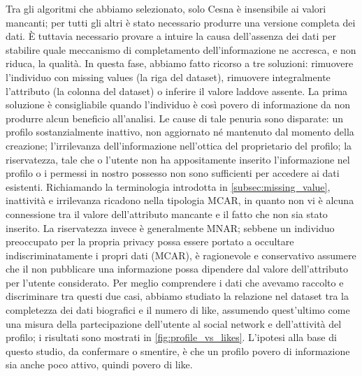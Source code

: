 Tra gli algoritmi che abbiamo selezionato, solo Cesna \cite{cesna} è insensibile ai valori mancanti; per tutti gli altri è stato necessario produrre una versione completa dei dati. \`E tuttavia necessario provare a intuire la causa dell'assenza dei dati per stabilire quale meccanismo di completamento dell'informazione ne accresca, e non riduca, la qualità. In questa fase, abbiamo fatto ricorso a tre soluzioni: rimuovere l'individuo con missing values (la riga del dataset), rimuovere integralmente l'attributo (la colonna del dataset) o inferire il valore laddove assente. La prima soluzione è consigliabile quando l'individuo è così povero di informazione da non produrre alcun beneficio all'analisi. Le cause di tale penuria sono disparate: un profilo sostanzialmente inattivo, non aggiornato né mantenuto dal momento della creazione; l'irrilevanza dell'informazione nell'ottica del proprietario del profilo; la riservatezza, tale che o l'utente non ha appositamente inserito l'informazione nel profilo o i permessi in nostro possesso non sono sufficienti per accedere ai dati esistenti. Richiamando la terminologia introdotta in \autoref{subsec:missing_value}, inattività e irrilevanza ricadono nella tipologia MCAR, in quanto non vi è alcuna connessione tra il valore dell'attributo mancante e il fatto che non sia stato inserito. La riservatezza invece è generalmente MNAR; sebbene un individuo preoccupato per la propria privacy possa essere portato a occultare indiscriminatamente i propri dati (MCAR), è ragionevole e conservativo assumere che il non pubblicare una informazione possa dipendere dal valore dell'attributo per l'utente considerato. Per meglio comprendere i dati che avevamo raccolto e discriminare tra questi due casi, abbiamo studiato la relazione nel dataset tra la completezza dei dati biografici e il numero di like, assumendo quest'ultimo come una misura della partecipazione dell'utente al social network e dell'attività del profilo; i risultati sono mostrati in \autoref{fig:profile_vs_likes}. L'ipotesi alla base di questo studio, da confermare o smentire, è che un profilo povero di informazione sia anche poco attivo, quindi povero di like.
